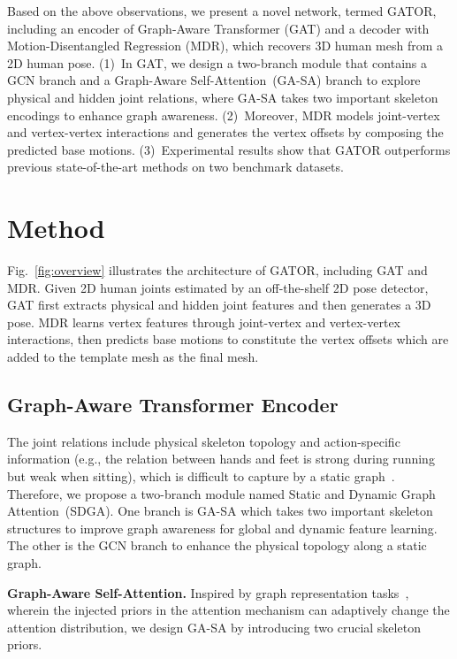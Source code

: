 \documentclass{article}
\def\VspacePa{\vspace{-0.30cm}}
\def\VspacePb{\vspace{-0.20cm}}
\begin{document}
Based on the above observations, we present a novel network, termed GATOR, including an encoder of Graph-Aware Transformer (GAT) and a decoder with Motion-Disentangled Regression (MDR), which recovers 3D human mesh from a 2D human pose. (1)~In GAT, we design a two-branch module that contains a GCN branch and a Graph-Aware Self-Attention~(GA-SA) branch to explore physical and hidden joint relations, where GA-SA takes two important skeleton encodings to enhance graph awareness. 
(2)~Moreover, MDR models joint-vertex and vertex-vertex interactions and generates the vertex offsets by composing the predicted base motions.
(3)~Experimental results show that GATOR outperforms previous state-of-the-art methods on two benchmark datasets.


\vspace{-3mm}
\section{Method}
\vspace{-3mm}
\label{sec:method}
Fig.~\ref{fig:overview} illustrates the architecture of GATOR, including GAT and MDR. 
Given 2D human joints estimated by an off-the-shelf 2D pose detector, GAT first extracts physical and hidden joint features and then generates a 3D pose. MDR learns vertex features through joint-vertex and vertex-vertex interactions, then predicts base motions to constitute the vertex offsets which are added to the template mesh as the final mesh.

\VspacePa
\vspace{-1mm}
\subsection{Graph-Aware Transformer Encoder}
\VspacePb
The joint relations include physical skeleton topology and action-specific information (e.g., the relation between hands and feet is strong during running but weak when sitting), which is difficult to capture by a static graph~\cite{zeng2021learning}. Therefore, we propose a two-branch module named Static and Dynamic Graph Attention~(SDGA). One branch is GA-SA which takes two important skeleton structures to improve graph awareness for global and dynamic feature learning. The other is the GCN branch to enhance the physical topology along a static graph.

\noindent \textbf{Graph-Aware Self-Attention.}
Inspired by graph representation tasks~\cite{ying2021transformers}, wherein 
the injected priors in the attention mechanism can adaptively change the attention distribution, we design GA-SA by introducing two crucial skeleton priors. 
\end{document}
